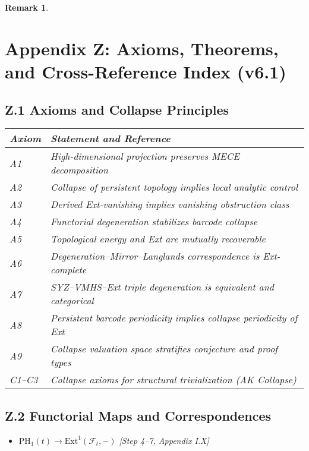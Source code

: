 \documentclass[11pt]{article}
\newtheorem{remark}[theorem]{Remark}
\begin{document}
\begin{remark}
\section*{Appendix Z: Axioms, Theorems, and Cross-Reference Index (v6.1)}

\subsection*{Z.1 Axioms and Collapse Principles}
\begin{tabular}{ll}
\textbf{Axiom} & \textbf{Statement and Reference} \\
\hline
A1 & High-dimensional projection preserves MECE decomposition \quad [Sec. 2.1] \\
A2 & Collapse of persistent topology implies local analytic control \quad [Step 1–3] \\
A3 & Derived Ext-vanishing implies vanishing obstruction class \quad [Appendix G] \\
A4 & Functorial degeneration stabilizes barcode collapse \quad [Appendix H.2] \\
A5 & Topological energy and Ext are mutually recoverable \quad [Appendix C, I.X] \\
A6 & Degeneration–Mirror–Langlands correspondence is Ext-complete \quad [Appendix I.13] \\
A7 & SYZ–VMHS–Ext triple degeneration is equivalent and categorical \quad [Appendix H.5] \\
A8 & Persistent barcode periodicity implies collapse periodicity of Ext \quad [Appendix D, N] \\
A9 & Collapse valuation space stratifies conjecture and proof types \quad [Appendix V, W] \\
C1–C3 & Collapse axioms for structural trivialization (AK Collapse) \quad [Appendix J] \\
\end{tabular}

\vspace{1em}

\subsection*{Z.2 Functorial Maps and Correspondences}
\begin{itemize}
  \item $\mathrm{PH}_1(t) \longrightarrow \mathrm{Ext}^1(\mathcal{F}_t, -)$  
  \hfill [Step 4–7, Appendix I.X]


\end{itemize}
\end{remark}
\end{document}
